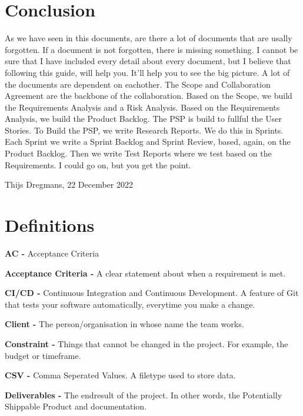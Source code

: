 \documentclass[10pt]{report}
\begin{document}
\newpage

\chapter{Conclusion}

As we have seen in this documents, are there a lot of documents that are usally forgotten. If a document is not forgotten, there is missing something. I cannot be sure that I have included every detail about every document, but I believe that following this guide, will help you. It'll help you to see the big picture. A lot of the documents are dependent on eachother. The Scope and Collaboration Agreement are the backbone of the collaboration. Based on the Scope, we build the Requirements Analysis and a Risk Analysis. Based on the Requirements Analysis, we build the Product Backlog. The PSP is build to fullful the User Stories. To Build the PSP, we write Research Reports. We do this in Sprints. Each Sprint we write a Sprint Backlog and Sprint Review, based, again, on the Product Backlog. Then we write Test Reports where we test based on the Requirements. I could go on, but you get the point.

\bigskip

Thijs Dregmans, 22 December 2022

\chapter{Definitions}


\noindent\textbf{AC -} Acceptance Criteria

\noindent\textbf{Acceptance Criteria -} A clear statement about when a requirement is met. 

\noindent\textbf{CI/CD -} Continuous Integration and Continuous Development. A feature of Git that tests your software automatically, everytime you make a change.

\noindent\textbf{Client -} The person/organisation in whose name the team works.

\noindent\textbf{Constraint -} Things that cannot be changed in the project. For example, the budget or timeframe.

\noindent\textbf{CSV -} Comma Seperated Values. A filetype used to store data.

\noindent\textbf{Deliverables -} The endresult of the project. In other words, the Potentially Shippable Product and documentation.
\end{document}

